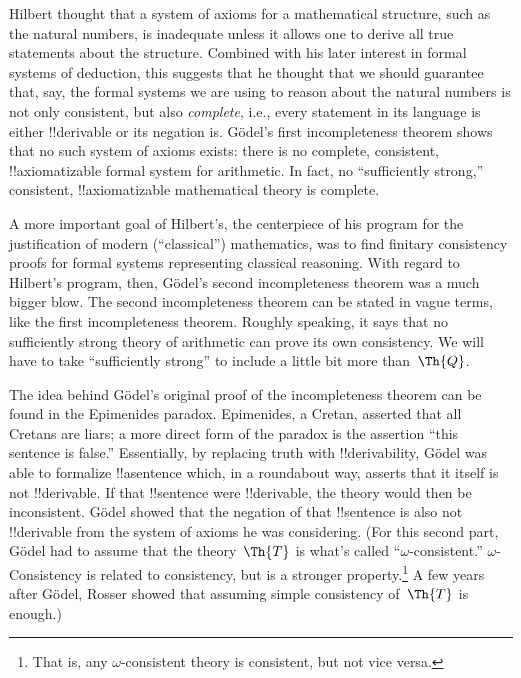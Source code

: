 \documentclass[../../../include/open-logic-section]{subfiles}
\begin{document}

Hilbert thought that a system of axioms for a mathematical structure,
such as the natural numbers, is inadequate unless it allows one to
derive all true statements about the structure. Combined with his
later interest in formal systems of deduction, this suggests that he
thought that we should guarantee that, say, the formal systems we are
using to reason about the natural numbers is not only consistent, but
also \emph{complete}, i.e., every statement in its language is either
!!{derivable} or its negation is. G\"odel's first incompleteness theorem
shows that no such system of axioms exists: there is no complete,
consistent, !!{axiomatizable} formal system for arithmetic.  In fact,
no ``sufficiently strong,'' consistent, !!{axiomatizable} mathematical
theory is complete.

A more important goal of Hilbert's, the centerpiece of his program for
the justification of modern (``classical'') mathematics, was to find
finitary consistency proofs for formal systems representing classical
reasoning.  With regard to Hilbert's program, then, G\"odel's second
incompleteness theorem was a much bigger blow. The second
incompleteness theorem can be stated in vague terms, like the first
incompleteness theorem. Roughly speaking, it says that no sufficiently
strong theory of arithmetic can prove its own consistency. We will
have to take ``sufficiently strong'' to include a little bit more
than~$\Th{Q}$.

The idea behind G\"odel's original proof of the incompleteness theorem
can be found in the Epimenides paradox. Epimenides, a Cretan, asserted
that all Cretans are liars; a more direct form of the paradox is the
assertion ``this sentence is false.'' Essentially, by replacing truth
with !!{derivability}, G\"odel was able to formalize !!a{sentence}
which, in a roundabout way, asserts that it itself is not
!!{derivable}.  If that !!{sentence} were !!{derivable}, the theory
would then be inconsistent.  G\"odel showed that the negation of that
!!{sentence} is also not !!{derivable} from the system of axioms he was
considering. (For this second part, G\"odel had to assume that the
theory~$\Th{T}$ is what's called ``$\omega$-consistent.''
$\omega$-Consistency is related to consistency, but is a stronger
property.\footnote{That is, any $\omega$-consistent theory is
consistent, but not vice versa.} A few years after G\"odel, Rosser
showed that assuming simple consistency of~$\Th{T}$ is enough.)
\end{document}
